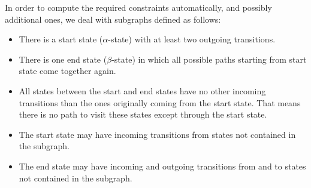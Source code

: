 \documentclass[conference]{IEEEtran}
\begin{document}
In order to compute the required constraints automatically, and possibly additional ones, we deal with subgraphs defined as follows:

\begin{itemize}
	\item There is a start state ($\alpha$-state) with at least two outgoing transitions.
	\item There is one end state ($\beta$-state) in which all possible paths starting from start state come together again.
	\item All states between the start and end states have no other incoming transitions than the ones originally coming from the start state. That means there is no path to visit these states except through the start state.
	\item The start state may have incoming transitions from states not contained in the subgraph.
	\item The end state may have incoming and outgoing transitions from and to states not contained in the subgraph.
\end{itemize}
\end{document}
